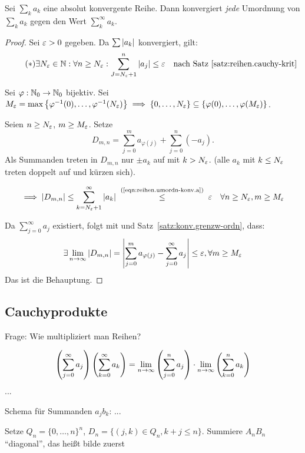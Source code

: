 \documentclass[12pt]{scrreprt}
\begin{document}
\begin{satz}\label{satz:reihen.umordn-konv}
Sei $\sum_k a_k$ eine absolut konvergente Reihe. Dann konvergiert \emph{jede} Umordnung von $\sum_k a_k$
gegen den Wert $\sum^\infty_k a_k$.
\end{satz}
\begin{proof}
Sei $\varepsilon > 0$ gegeben. Da $\sum \left\lvert a_k\right\lvert$ konvergiert, gilt:
\begin{equation}\label{eqn:reihen.umordn-konv.a}\tag{$*$}
\exists N_\varepsilon \in \mathbb{N}: \forall n\ge N_\varepsilon: \sum^n_{J = N_\varepsilon+1} \left\lvert a_j\right\lvert \le \varepsilon\quad \text{nach 
Satz~\ref{satz:reihen.cauchy-krit}}
\end{equation}

\noindent Sei $\varphi: \mathbb{N}_0 \rightarrow \mathbb{N}_0$ bijektiv. Sei $M_\varepsilon = \max \left\{\varphi^{-1}(0), \dotsc, \varphi^{-1}(N_\varepsilon)\right\}
\implies \left\{0, \dotsc, N_\varepsilon\right\} \subseteq \left\{\varphi(0), \dotsc, \varphi(M_\varepsilon)\right\}$.

\bigskip 

\noindent Seien $n \ge N_\varepsilon$, $m\ge M_\varepsilon$. Setze \[D_{m,n} = \sum_{j=0}^m a_{\varphi(j)} + \sum_{j=0}^n (-a_j).\]
Als Summanden treten in $D_{m,n}$ nur $\pm a_k$ auf mit $k > N_\varepsilon$. (alle $a_k$ mit $k \le N_\varepsilon$ treten doppelt
auf und kürzen sich).

\[\folgt \abs{D_{m,n}} \le \sum_{k = N_\ep +1}^\infty \abs{a_k} \nach{\le}{(\ref{eqn:reihen.umordn-konv.a})} \ep
\quad \forall n\ge N_\ep, m\ge M_\ep\]

Da $\sum_{j=0}^\infty a_j$ existiert, folgt mit \ninf{} und Satz~\ref{satz:konv.grenzw-ordn}, dass:
\[\exists\lim_{n\rightarrow\infty}\left\lvert D_{m,n}\right\lvert = \left\lvert\sum_{j=0}^m a_{\varphi(j)} - \sum_{j=0}^\infty a_j\right\lvert \le \varepsilon, \forall m\ge M_\varepsilon\]
Das ist die Behauptung.
\end{proof}

\subsection*{Cauchyprodukte}
Frage: Wie multipliziert man Reihen?

\begin{equation}\label{eqn:reihen.mult-rwert}
\left(\sum_{j=0}^\infty a_j\right)\left(\sum_{k=0}^\infty a_k\right) = \lim_{n\rightarrow\infty}\left(\sum_{j=0}^n a_j\right) 
\cdot \lim_{n\rightarrow\infty}\left(\sum_{k=0}^n a_k\right)
\end{equation}
...

Schema für Summanden $a_jb_k$:
...

Setze $Q_n = \{0, \dotsc, n\}^n$, $D_n = \{(j, k) \in Q_n, k+j \le n\}$.
Summiere $A_nB_n$ "`diagonal"', das heißt bilde zuerst
\end{document}
